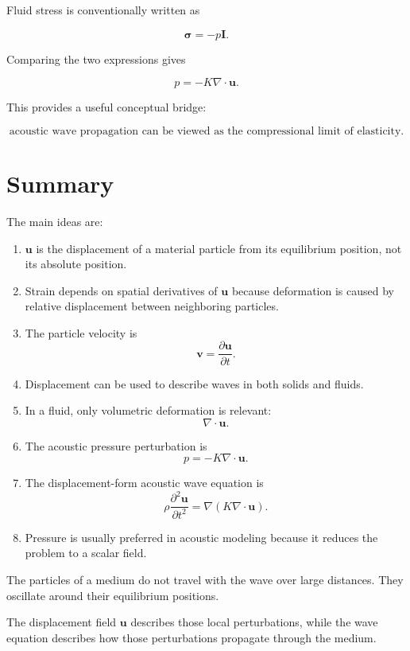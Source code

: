 \documentclass[11pt]{article}
\begin{document}
Fluid stress is conventionally written as

\begin{equation}
    \bm{\sigma}=-p\bm{I}.
\end{equation}

Comparing the two expressions gives

\begin{equation}
    \boxed{
    p=-K\nabla\cdot\bm{u}.
    }
\end{equation}

This provides a useful conceptual bridge:

\begin{equation}
    \boxed{
    \text{acoustic wave propagation can be viewed as the compressional limit of elasticity.}
    }
\end{equation}

\section{Summary}

The main ideas are:

\begin{enumerate}
    \item $\bm{u}$ is the displacement of a material particle from its equilibrium position, not its absolute position.

    \item Strain depends on spatial derivatives of $\bm{u}$ because deformation is caused by relative displacement between neighboring particles.

    \item The particle velocity is
    \[
        \bm{v}=\frac{\partial\bm{u}}{\partial t}.
    \]

    \item Displacement can be used to describe waves in both solids and fluids.

    \item In a fluid, only volumetric deformation is relevant:
    \[
        \nabla\cdot\bm{u}.
    \]

    \item The acoustic pressure perturbation is
    \[
        p=-K\nabla\cdot\bm{u}.
    \]

    \item The displacement-form acoustic wave equation is
    \[
        \rho\frac{\partial^2\bm{u}}{\partial t^2}
        =
        \nabla\left(K\nabla\cdot\bm{u}\right).
    \]

    \item Pressure is usually preferred in acoustic modeling because it reduces the problem to a scalar field.
\end{enumerate}

\begin{tcolorbox}[title=Central physical interpretation]
The particles of a medium do not travel with the wave over large distances. They oscillate around their equilibrium positions.

The displacement field $\bm{u}$ describes those local perturbations, while the wave equation describes how those perturbations propagate through the medium.
\end{tcolorbox}
\end{document}
